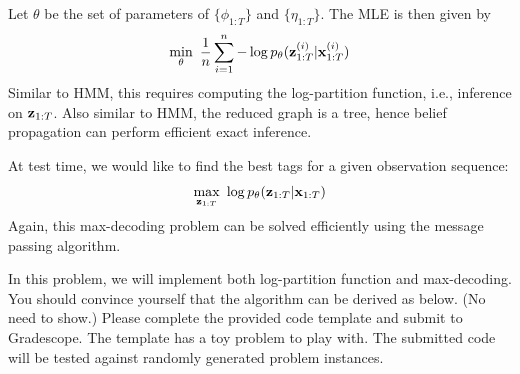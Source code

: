 \documentclass{article}
\begin{document}
Let $ \theta $ be the set of parameters of $ \{ \phi_{1:T} \} $ and $ \{ \eta_{1:T} \} $. 
The MLE is then given by
\begin{align}
\min_{\theta} \ \frac{1}{n}  \sum_{i=1}^{n} - \log p_{\theta} (\mathbf{z}_{1:T}^{(i)} | \mathbf{x}_{1:T}^{(i)})
\end{align}
Similar to HMM, this requires computing the log-partition function, i.e., inference on $ \mathbf{z}_{1:T} $. 
Also similar to HMM, the reduced graph is a tree, hence belief propagation can perform efficient exact inference. 


At test time, we would like to find the best tags for a given observation sequence:
\begin{align}
\max_{\mathbf{z}_{1:T}} \ \log p_{\theta} (\mathbf{z}_{1:T} | \mathbf{x}_{1:T})
\end{align}
Again, this max-decoding problem can be solved efficiently using the message passing algorithm. 

In this problem, we will implement both log-partition function and max-decoding. 
You should convince yourself that the algorithm can be derived as below. (No need to show.)
Please complete the provided code template and submit to Gradescope. 
The template has a toy problem to play with. 
The submitted code will be tested against randomly generated problem instances. 
\end{document}
